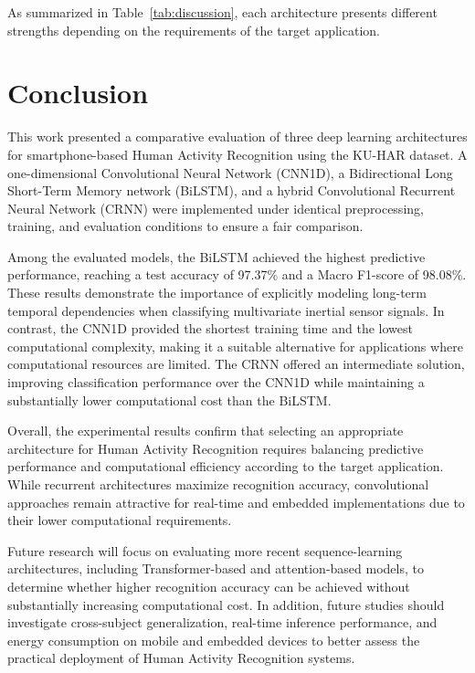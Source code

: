 \documentclass[journal]{IEEEtran}
\begin{document}
As summarized in Table~\ref{tab:discussion}, each architecture presents different strengths depending on the requirements of the target application.

\section{Conclusion}

This work presented a comparative evaluation of three deep learning architectures for smartphone-based Human Activity Recognition using the KU-HAR dataset. A one-dimensional Convolutional Neural Network (CNN1D), a Bidirectional Long Short-Term Memory network (BiLSTM), and a hybrid Convolutional Recurrent Neural Network (CRNN) were implemented under identical preprocessing, training, and evaluation conditions to ensure a fair comparison.

Among the evaluated models, the BiLSTM achieved the highest predictive performance, reaching a test accuracy of 97.37\% and a Macro F1-score of 98.08\%. These results demonstrate the importance of explicitly modeling long-term temporal dependencies when classifying multivariate inertial sensor signals. In contrast, the CNN1D provided the shortest training time and the lowest computational complexity, making it a suitable alternative for applications where computational resources are limited. The CRNN offered an intermediate solution, improving classification performance over the CNN1D while maintaining a substantially lower computational cost than the BiLSTM.

Overall, the experimental results confirm that selecting an appropriate architecture for Human Activity Recognition requires balancing predictive performance and computational efficiency according to the target application. While recurrent architectures maximize recognition accuracy, convolutional approaches remain attractive for real-time and embedded implementations due to their lower computational requirements.

Future research will focus on evaluating more recent sequence-learning architectures, including Transformer-based and attention-based models, to determine whether higher recognition accuracy can be achieved without substantially increasing computational cost. In addition, future studies should investigate cross-subject generalization, real-time inference performance, and energy consumption on mobile and embedded devices to better assess the practical deployment of Human Activity Recognition systems.
\end{document}
